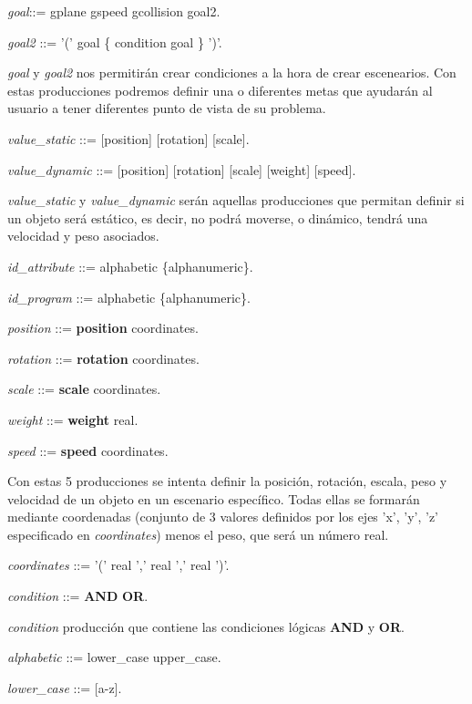 \documentclass[12pt]{article}
\begin{document}
\noindent \textit{goal}::=  gplane \textbar gspeed \textbar gcollision \textbar goal2.

\noindent \textit{goal2} ::= '(' goal \{ condition goal \} ')'.

\textit{goal} y \textit{goal2} nos permitirán crear condiciones a la hora de crear escenearios. Con estas producciones podremos definir una o diferentes metas que ayudarán al usuario a tener diferentes punto de vista de su problema.

\noindent \textit{value\_static} ::= [position] [rotation] [scale].

\noindent \textit{value\_dynamic} ::= [position] [rotation] [scale] [weight] [speed].

\textit{value\_static} y \textit{value\_dynamic} serán aquellas producciones que permitan definir si un objeto será estático, es decir, no podrá moverse, o dinámico, tendrá una velocidad y peso asociados.

\noindent \textit{id\_attribute} ::= alphabetic \{alphanumeric\}.

\noindent \textit{id\_program} ::= alphabetic \{alphanumeric\}.

\noindent \textit{position} ::= \textbf{position} coordinates.

\noindent \textit{rotation} ::= \textbf{rotation} coordinates.

\noindent \textit{scale} ::=  \textbf{scale} coordinates.

\noindent \textit{weight} ::= \textbf{weight} real.

\noindent \textit{speed} ::= \textbf{speed} coordinates.

Con estas 5 producciones se intenta definir la posición, rotación, escala, peso y velocidad de un objeto en un escenario específico. Todas ellas se formarán mediante coordenadas (conjunto de 3 valores definidos por los ejes 'x', 'y', 'z' especificado en \textit{coordinates}) menos el peso, que será un número real.

\noindent \textit{coordinates} ::= '(' real ',' real ','  real ')'.

\noindent \textit{condition} ::= \textbf{AND} \textbar \textbf{OR}.

\textit{condition} producción que contiene las condiciones lógicas \textbf{AND} y \textbf{OR}.

\noindent \textit{alphabetic} ::= lower\_case  \textbar  upper\_case.

\noindent \textit{lower\_case} ::= [a-z].
\end{document}
